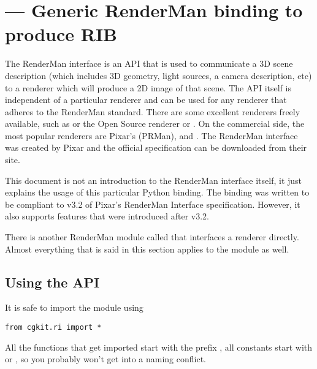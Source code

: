 \section{ ---
         Generic RenderMan binding to produce RIB}


The RenderMan\textsuperscript{\textregistered} interface is an API
that is used to communicate a 3D scene description (which includes 3D
geometry, light sources, a camera description, etc) to a renderer
which will produce a 2D image of that scene. The API itself is
independent of a particular renderer and can be used for any renderer
that adheres to the RenderMan standard.
There are some excellent renderers freely available, such
as  or the Open Source renderer 
 or
. On the
commercial side, the most popular renderers are Pixar's
 (PRMan), 
 and 
. 
The RenderMan interface was
created by Pixar and the official specification can be downloaded from
their site.

This document is not an introduction to the RenderMan interface
itself, it just explains the usage of this particular Python
binding. The binding was written to be compliant to v3.2 of Pixar's
RenderMan Interface specification. However, it also supports features
that were introduced after v3.2.

There is another RenderMan module called  that
interfaces a renderer directly. Almost everything that is said in this section
applies to the  module as well.

\subsection{Using the API}

It is safe to import the module using 

\begin{verbatim}
from cgkit.ri import * 
\end{verbatim}

All the functions that get imported start with the prefix ,
all constants start with  or , so you probably
won't get into a naming conflict.

